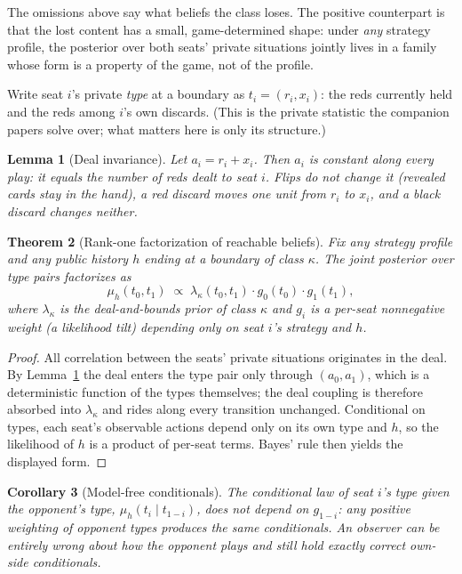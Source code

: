 \documentclass[11pt]{article}
\theoremstyle{plain}
\newtheorem{theorem}{Theorem}[section]
\newtheorem{lemma}[theorem]{Lemma}
\newtheorem{corollary}[theorem]{Corollary}
\theoremstyle{definition}
\theoremstyle{remark}
\begin{document}
The omissions above say what beliefs the class loses. The positive
counterpart is that the lost content has a small, game-determined shape:
under \emph{any} strategy profile, the posterior over both seats' private
situations jointly lives in a family whose form is a property of the game,
not of the profile.

Write seat $i$'s private \emph{type} at a boundary as $t_i=(r_i,x_i)$:
the reds currently held and the reds among $i$'s own discards. (This is
the private statistic the companion papers solve over; what matters here
is only its structure.)

\begin{lemma}[Deal invariance]\label{lem:ainv}
Let $a_i = r_i + x_i$. Then $a_i$ is constant along every play: it equals
the number of reds dealt to seat $i$. Flips do not change it (revealed
cards stay in the hand), a red discard moves one unit from $r_i$ to $x_i$,
and a black discard changes neither.
\end{lemma}

\begin{theorem}[Rank-one factorization of reachable beliefs]\label{thm:rankone}
Fix any strategy profile and any public history $h$ ending at a boundary
of class $\kappa$. The joint posterior over type pairs factorizes as
\[
  \mu_h(t_0,t_1)\;\propto\;\lambda_\kappa(t_0,t_1)\cdot g_0(t_0)\cdot g_1(t_1),
\]
where $\lambda_\kappa$ is the deal-and-bounds prior of class $\kappa$ and
$g_i$ is a per-seat nonnegative weight (a likelihood tilt) depending only
on seat $i$'s strategy and $h$.
\end{theorem}

\begin{proof}
All correlation between the seats' private situations originates in the
deal. By Lemma~\ref{lem:ainv} the deal enters the type pair only
through $(a_0,a_1)$, which is a deterministic function of the types
themselves; the deal coupling is therefore absorbed into
$\lambda_\kappa$ and rides along every transition unchanged.
Conditional on types, each seat's
observable actions depend only on its own type and $h$, so the likelihood
of $h$ is a product of per-seat terms. Bayes' rule then yields the
displayed form.
\end{proof}

\begin{corollary}[Model-free conditionals]\label{cor:modelfree}
The conditional law of seat $i$'s type given the opponent's type,
$\mu_h(t_i \mid t_{1-i})$, does not depend on $g_{1-i}$: any positive
weighting of opponent types produces the same conditionals. An observer
can be entirely wrong about how the opponent plays and still hold exactly
correct own-side conditionals.
\end{corollary}
\end{document}

